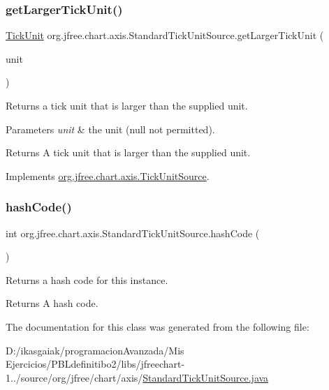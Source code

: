 \subsubsection{\texorpdfstring{get\+Larger\+Tick\+Unit()}{getLargerTickUnit()}}
{\footnotesize\ttfamily \mbox{\hyperlink{classorg_1_1jfree_1_1chart_1_1axis_1_1_tick_unit}{Tick\+Unit}} org.\+jfree.\+chart.\+axis.\+Standard\+Tick\+Unit\+Source.\+get\+Larger\+Tick\+Unit (\begin{DoxyParamCaption}\item[{\mbox{\hyperlink{classorg_1_1jfree_1_1chart_1_1axis_1_1_tick_unit}{Tick\+Unit}}}]{unit }\end{DoxyParamCaption})}

Returns a tick unit that is larger than the supplied unit.


\begin{DoxyParams}{Parameters}
{\em unit} & the unit ({\ttfamily null} not permitted).\\
\hline
\end{DoxyParams}
\begin{DoxyReturn}{Returns}
A tick unit that is larger than the supplied unit. 
\end{DoxyReturn}


Implements \mbox{\hyperlink{interfaceorg_1_1jfree_1_1chart_1_1axis_1_1_tick_unit_source_ada1fecd32d2e0ff584a7d2a55ffc349a}{org.\+jfree.\+chart.\+axis.\+Tick\+Unit\+Source}}.

\mbox{\label{classorg_1_1jfree_1_1chart_1_1axis_1_1_standard_tick_unit_source_ad4312864bbb2940551d51132802deb41}} 
\subsubsection{\texorpdfstring{hash\+Code()}{hashCode()}}
{\footnotesize\ttfamily int org.\+jfree.\+chart.\+axis.\+Standard\+Tick\+Unit\+Source.\+hash\+Code (\begin{DoxyParamCaption}{ }\end{DoxyParamCaption})}

Returns a hash code for this instance.

\begin{DoxyReturn}{Returns}
A hash code. 
\end{DoxyReturn}


The documentation for this class was generated from the following file\+:\begin{DoxyCompactItemize}
\item 
D\+:/ikasgaiak/programacion\+Avanzada/\+Mis Ejercicios/\+P\+B\+Ldefinitibo2/libs/jfreechart-\/1../source/org/jfree/chart/axis/\mbox{\hyperlink{_standard_tick_unit_source_8java}{Standard\+Tick\+Unit\+Source.\+java}}\end{DoxyCompactItemize}
